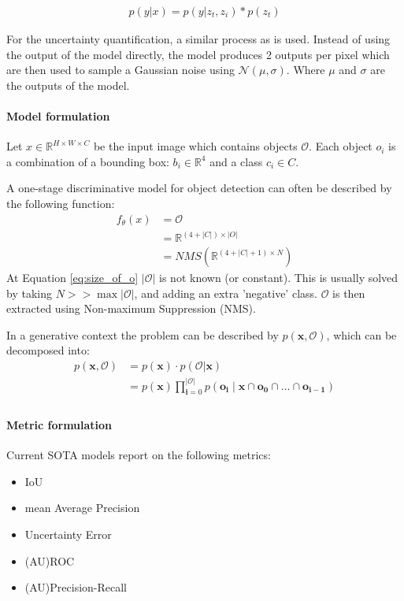 \documentclass{article}
\begin{document}
\begin{align}
  p(y|x) = p(y|z_t, z_i) * p(z_t) \label{eq:LDMS}
\end{align}

For the uncertainty quantification, a similar process as \cite{tanno2021uncertainty} is used. Instead of using the output of the model directly, the model produces 2 outputs per pixel which are then used to sample a Gaussian noise using $\mathcal{N}(\mu, \sigma)$. Where $\mu$ and $\sigma$ are the outputs of the model.


\paragraph*{Model formulation}
Let $x \in \mathbb{R}^{H\times W\times C}$ be the input image which contains objects $\mathcal{O}$. Each object $o_i$ is a combination of a bounding box: $b_i \in \mathbb{R}^{4}$ and a class $c_i \in C$.

A one-stage discriminative model for object detection can often be described by the following function:
\begin{align}
  f_{\theta}(x) & = \mathcal{O}                                             \\
                & = \mathbb{R}^{(4 + |C|) \times |O|} \label{eq:size_of_o}  \\
                & = NMS(\mathbb{R}^{(4 + |C| + 1) \times N}) \label{eq:nms}
\end{align}
At Equation \ref{eq:size_of_o} $|\mathcal{O}|$ is not known (or constant). This is usually solved by taking $N >> \max{|\mathcal{O}|}$\cite{bochkovskiy2020yolov4, wang2022yolov7, liu2016ssd}, and adding an extra 'negative' class. $\mathcal{O}$ is then extracted using Non-maximum Suppression (NMS).

In a generative context the problem can be described by $p(\mathbf{x}, \mathcal{O})$, which can be decomposed into:
\begin{align}
  p(\mathbf{x}, \mathcal{O}) & = p(\mathbf{x}) \cdot p(\mathbf{\mathcal{O}} | \mathbf{x}) \label{eq:generative_model}                                                \\
                             & = p(\mathbf{x})\prod_{\mathbf{i} = 0}^{|\mathcal{O}|}p(\mathbf{o_i} \mid \mathbf{x} \cap \mathbf{o_0} \cap ... \cap \mathbf{o_{i-1}}) \\
\end{align}

\paragraph*{Metric formulation}
Current SOTA models report on the following metrics:
\begin{itemize}
  \item IoU
  \item mean Average Precision
  \item Uncertainty Error \cite{miller2019evaluating}
  \item (AU)ROC \cite{miller2019evaluating}
  \item (AU)Precision-Recall \cite{saito2015pr}
\end{itemize}
\end{document}
